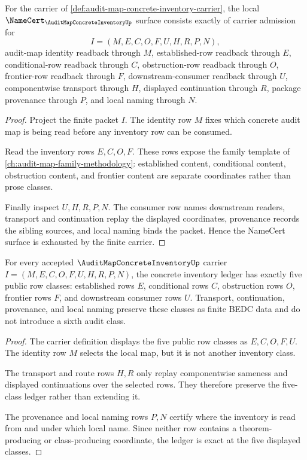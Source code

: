 \begin{theorem}
\label{thm:audit-map-concrete-inventory-namecert-obligations}
For the carrier of \autoref{def:audit-map-concrete-inventory-carrier}, the local $\NameCert_{\AuditMapConcreteInventoryUp}$ surface consists exactly of carrier admission for
$$
I=(M,E,C,O,F,U,H,R,P,N),
$$
audit-map identity readback through $M$, established-row readback through $E$, conditional-row readback through $C$, obstruction-row readback through $O$, frontier-row readback through $F$, downstream-consumer readback through $U$, componentwise transport through $H$, displayed continuation through $R$, package provenance through $P$, and local naming through $N$.
\end{theorem}
\begin{proof}
Project the finite packet $I$. The identity row $M$ fixes which concrete audit map is being read before any inventory row can be consumed.

Read the inventory rows $E,C,O,F$. These rows expose the family template of \autoref{ch:audit-map-family-methodology}: established content, conditional content, obstruction content, and frontier content are separate coordinates rather than prose classes.

Finally inspect $U,H,R,P,N$. The consumer row names downstream readers, transport and continuation replay the displayed coordinates, provenance records the sibling sources, and local naming binds the packet. Hence the NameCert surface is exhausted by the finite carrier.
\end{proof}

\begin{theorem}
\label{thm:audit-map-concrete-inventory-ledger}
For every accepted $\AuditMapConcreteInventoryUp$ carrier $I=(M,E,C,O,F,U,H,R,P,N)$, the concrete inventory ledger has exactly five public row classes: established rows $E$, conditional rows $C$, obstruction rows $O$, frontier rows $F$, and downstream consumer rows $U$. Transport, continuation, provenance, and local naming preserve these classes as finite BEDC data and do not introduce a sixth audit class.
\end{theorem}
\begin{proof}
The carrier definition displays the five public row classes as $E,C,O,F,U$. The identity row $M$ selects the local map, but it is not another inventory class.

The transport and route rows $H,R$ only replay componentwise sameness and displayed continuations over the selected rows. They therefore preserve the five-class ledger rather than extending it.

The provenance and local naming rows $P,N$ certify where the inventory is read from and under which local name. Since neither row contains a theorem-producing or class-producing coordinate, the ledger is exact at the five displayed classes.
\end{proof}

